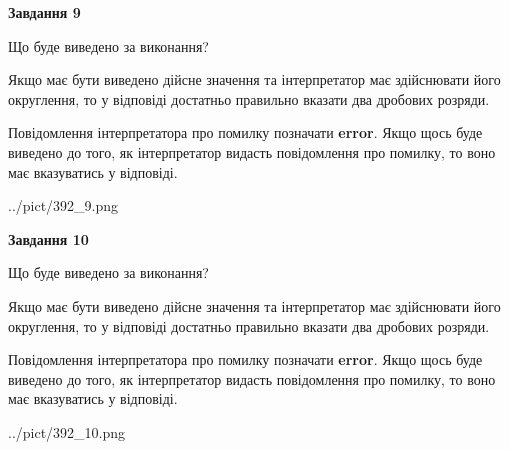 \documentclass[12pt, ukrainian]{article}
\begin{document}
{\begin {Large}
{\begin {center}\textbf{Завдання 9}\end {center}}\par
Що буде виведено за виконання? \par

Якщо має бути виведено дійсне значення та інтерпретатор має здійснювати його округлення, 
то у відповіді достатньо правильно вказати два дробових розряди.

Повідомлення інтерпретатора про помилку позначати \textbf{error}.
Якщо щось буде виведено до того, як інтерпретатор видасть повідомлення про помилку, 
то воно має вказуватись у відповіді. \par

\begin{center}
	{../pict/392_9.png}
\end{center}
\newpage

{\begin {center}\textbf{Завдання 10}\end {center}}\par
Що буде виведено за виконання? \par

Якщо має бути виведено дійсне значення та інтерпретатор має здійснювати його округлення, 
то у відповіді достатньо правильно вказати два дробових розряди.

Повідомлення інтерпретатора про помилку позначати \textbf{error}.
Якщо щось буде виведено до того, як інтерпретатор видасть повідомлення про помилку, 
то воно має вказуватись у відповіді. \par

\begin{center}
	{../pict/392_10.png}
\end{center}
\newpage

\end {Large}}
\end{document}
